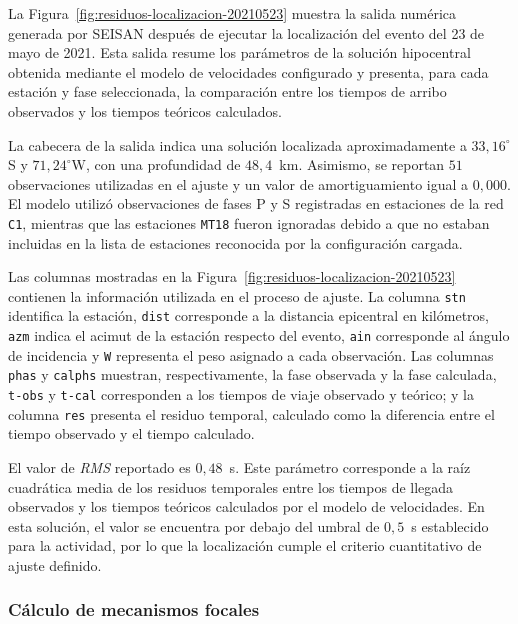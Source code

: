 \documentclass[a4paper,12pt]{article} %
\numberwithin{equation}{section} %
\numberwithin{figure}{section} %
\begin{document}
La Figura~\ref{fig:residuos-localizacion-20210523} muestra la salida numérica generada por SEISAN después de ejecutar la localización del evento del 23 de mayo de 2021. Esta salida resume los parámetros de la solución hipocentral obtenida mediante el modelo de velocidades configurado y presenta, para cada estación y fase seleccionada, la comparación entre los tiempos de arribo observados y los tiempos teóricos calculados.

La cabecera de la salida indica una solución localizada aproximadamente a $33{,}16^\circ$S y $71{,}24^\circ$W, con una profundidad de $48{,}4$~km. Asimismo, se reportan $51$ observaciones utilizadas en el ajuste y un valor de amortiguamiento igual a $0{,}000$. El modelo utilizó observaciones de fases P y S registradas en estaciones de la red \texttt{C1}, mientras que las estaciones \texttt{MT18} fueron ignoradas debido a que no estaban incluidas en la lista de estaciones reconocida por la configuración cargada.

Las columnas mostradas en la Figura~\ref{fig:residuos-localizacion-20210523} contienen la información utilizada en el proceso de ajuste. La columna \texttt{stn} identifica la estación, \texttt{dist} corresponde a la distancia epicentral en kilómetros, \texttt{azm} indica el acimut de la estación respecto del evento, \texttt{ain} corresponde al ángulo de incidencia y \texttt{W} representa el peso asignado a cada observación. Las columnas \texttt{phas} y \texttt{calphs} muestran, respectivamente, la fase observada y la fase calculada, \texttt{t-obs} y \texttt{t-cal} corresponden a los tiempos de viaje observado y teórico; y la columna \texttt{res} presenta el residuo temporal, calculado como la diferencia entre el tiempo observado y el tiempo calculado.

El valor de \textit{RMS} reportado es $0{,}48$~s. Este parámetro corresponde a la raíz cuadrática media de los residuos temporales entre los tiempos de llegada observados y los tiempos teóricos calculados por el modelo de velocidades. En esta solución, el valor se encuentra por debajo del umbral de $0{,}5$~s establecido para la actividad, por lo que la localización cumple el criterio cuantitativo de ajuste definido.

\subsubsection{Cálculo de mecanismos focales}
\end{document}
